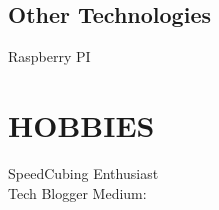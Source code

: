 \documentclass[]{deedy-resume-openfont}
\begin{document}
\begin{minipage}[t]{0.30\textwidth}
\subsection{Other Technologies}
 \textbullet{} Raspberry PI \\
\bigskip


\section{HOBBIES}
\textbullet{} SpeedCubing Enthusiast  \\
\textbullet{} Tech Blogger Medium:  \href{https://medium.com/@anshul.ahu/}{} \\
\sectionsep




%
%

\end{minipage} 
\hfill
\end{document}
